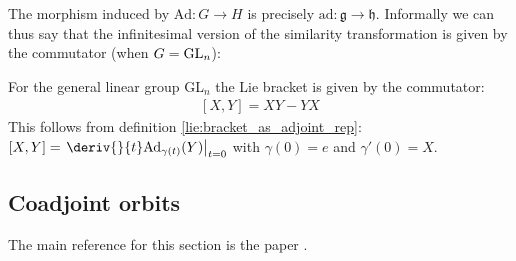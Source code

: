         \begin{example}
            	The morphism induced by $\text{Ad}:G\rightarrow H$ is precisely $\text{ad}:\mathfrak{g}\rightarrow\mathfrak{h}$. Informally we can thus say that the infinitesimal version of the similarity transformation is given by the commutator (when $G=\textup{GL}_n$):
        \end{example}
 	\begin{result}[Commutator]
        	For the general linear group GL$_n$ the Lie bracket is given by the commutator:
	        \begin{gather}
        	    	\boxed{[X, Y] = XY - YX}
        	\end{gather}
	        This follows from definition \ref{lie:bracket_as_adjoint_rep}: $[X, Y] = \left.\deriv{}{t}\text{Ad}_{\gamma(t)}(Y)\right|_{t=0}$ with $\gamma(0) = e$ and $\gamma'(0) = X$.
        \end{result}

\subsection{Coadjoint orbits}

	The main reference for this section is the paper \cite{witten_coadjoint}.

	
	
